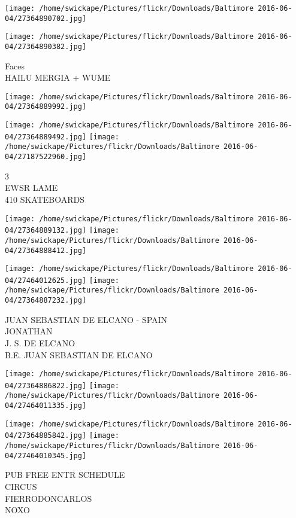 \documentclass[10pt,letterpaper]{article}
\begin{document}
\texttt{[image: /home/swickape/Pictures/flickr/Downloads/Baltimore 2016-06-04/27364890702.jpg]}

\vspace{0.25in}
\texttt{[image: /home/swickape/Pictures/flickr/Downloads/Baltimore 2016-06-04/27364890382.jpg]}

Faces\\
HAILU MERGIA + WUME\\
\pagebreak

\texttt{[image: /home/swickape/Pictures/flickr/Downloads/Baltimore 2016-06-04/27364889992.jpg]}

\vspace{0.25in}
\texttt{[image: /home/swickape/Pictures/flickr/Downloads/Baltimore 2016-06-04/27364889492.jpg]}
\texttt{[image: /home/swickape/Pictures/flickr/Downloads/Baltimore 2016-06-04/27187522960.jpg]}

3\\
EWSR LAME\\
410 SKATEBOARDS\\
\pagebreak

\texttt{[image: /home/swickape/Pictures/flickr/Downloads/Baltimore 2016-06-04/27364889132.jpg]}
\texttt{[image: /home/swickape/Pictures/flickr/Downloads/Baltimore 2016-06-04/27364888412.jpg]}

\texttt{[image: /home/swickape/Pictures/flickr/Downloads/Baltimore 2016-06-04/27464012625.jpg]}
\texttt{[image: /home/swickape/Pictures/flickr/Downloads/Baltimore 2016-06-04/27364887232.jpg]}

JUAN SEBASTIAN DE ELCANO {-} SPAIN\\
JONATHAN\\
J. S. DE ELCANO\\
B.E. JUAN SEBASTIAN DE ELCANO\\
\pagebreak

\texttt{[image: /home/swickape/Pictures/flickr/Downloads/Baltimore 2016-06-04/27364886822.jpg]}
\texttt{[image: /home/swickape/Pictures/flickr/Downloads/Baltimore 2016-06-04/27464011335.jpg]}

\texttt{[image: /home/swickape/Pictures/flickr/Downloads/Baltimore 2016-06-04/27364885842.jpg]}
\texttt{[image: /home/swickape/Pictures/flickr/Downloads/Baltimore 2016-06-04/27464010345.jpg]}

PUB FREE ENTR SCHEDULE\\
CIRCUS\\
FIERRODONCARLOS\\
NOXO\\
\pagebreak
\end{document}
